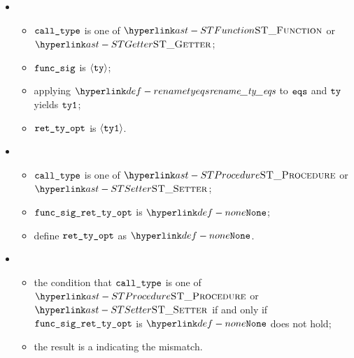 \ProseParagraph
\OneApplies
\begin{itemize}
  \item {}
  \begin{itemize}
    \item $\calltype$ is one of $\STFunction$ or $\STGetter$;
    \item $\funcsig$ is $\langle\tty\rangle$;
    \item applying $\renametyeqs$ to $\eqs$ and $\tty$ yields $\ttyone$\ProseOrTypeError;
    \item $\rettyopt$ is $\langle\ttyone\rangle$.
  \end{itemize}

  \item {}
  \begin{itemize}
    \item $\calltype$ is one of $\STProcedure$ or $\STSetter$;
    \item $\funcsigrettyopt$ is $\None$;
    \item define $\rettyopt$ as $\None$.
  \end{itemize}

  \item {}
  \begin{itemize}
    \item the condition that $\calltype$ is one of $\STProcedure$ or $\STSetter$
          if and only if $\funcsigrettyopt$ is $\None$ does not hold;
    \item the result is a \typingerrorterm{} indicating the mismatch.
  \end{itemize}
\end{itemize}

\FormallyParagraph
\begin{mathpar}
\end{mathpar}

\begin{mathpar}
\end{mathpar}

